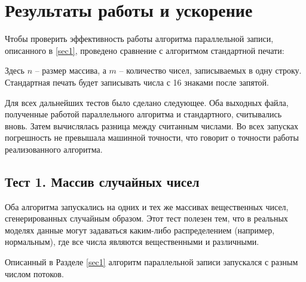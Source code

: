 \section{Результаты работы и ускорение}
Чтобы проверить эффективность работы алгоритма параллельной записи, описанного в \ref{sec1}, проведено сравнение с алгоритмом стандартной печати: \vspace{12pt}
Здесь $n$ -- размер массива, а $m$ -- количество чисел, записываемых в одну строку.
Стандартная печать будет записывать числа с 16 знаками после запятой.

Для всех дальнейших тестов было сделано следующее.
Оба выходных файла, полученные работой параллельного алгоритма и стандартного, считывались вновь. 
Затем вычислялась разница между считанным числами.
Во всех запусках погрешность не превышала машинной точности, что говорит о точности работы реализованного алгоритма.

\subsection{Тест 1. Массив случайных чисел} \label{t1}
Оба алгоритма запускались на одних и тех же массивах вещественных чисел, сгенерированных случайным образом. 
Этот тест полезен тем, что в реальных моделях данные могут задаваться каким-либо распределением (например, нормальным), где все числа являются вещественными и различными.

Описанный в Разделе \ref{sec1} алгоритм параллельной записи запускался с разным числом потоков.

